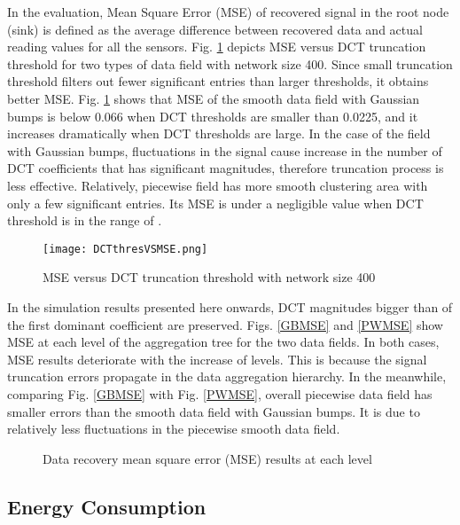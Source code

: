 \documentclass[conference]{IEEEtran}
\begin{document}
In the evaluation, Mean Square Error (MSE) of recovered signal in the root node (sink) 
is defined as the average difference between recovered data and actual 
reading values for all the sensors. Fig. \ref{thresVSmse} depicts MSE versus DCT truncation threshold 
for two types of data field with network size 400. 
Since small truncation threshold filters out fewer significant entries than larger thresholds, it 
obtains better MSE. Fig. \ref{thresVSmse} shows that MSE of the smooth data field with Gaussian bumps is below 
0.066 when DCT thresholds are smaller than 0.0225, and it increases 
dramatically when DCT thresholds are large. In the case of the field with Gaussian bumps, fluctuations in the signal
cause increase in the number of DCT coefficients that has significant magnitudes, therefore truncation process is less effective.  
Relatively, piecewise field has more smooth clustering area with only a few significant entries. 
Its MSE is under a negligible value when DCT threshold is in the range of . 
 
\begin{figure}
  \centering
  \texttt{[image: DCTthresVSMSE.png]}
  \caption{MSE versus DCT truncation threshold with network size 400}
  \label{thresVSmse}
\end{figure}

In the simulation results presented here onwards, DCT magnitudes bigger than  of the first dominant coefficient 
are preserved. Figs. \ref{GBMSE} and \ref{PWMSE} show MSE at each level of the aggregation tree for the two data fields. 
In both cases, MSE results deteriorate with the increase of levels. This is 
because the signal truncation errors propagate in the data aggregation hierarchy. 
In the meanwhile, comparing Fig. \ref{GBMSE} with Fig. \ref{PWMSE}, 
overall piecewise data field has smaller errors than the smooth data field with Gaussian bumps. It is 
due to relatively less fluctuations in the piecewise smooth data field. 

\begin{figure}
\centering
{}
\qquad
{}
\caption{Data recovery mean square error (MSE) results at each level }
\label{MSE}
\end{figure}


\subsection{Energy Consumption}
\end{document}
